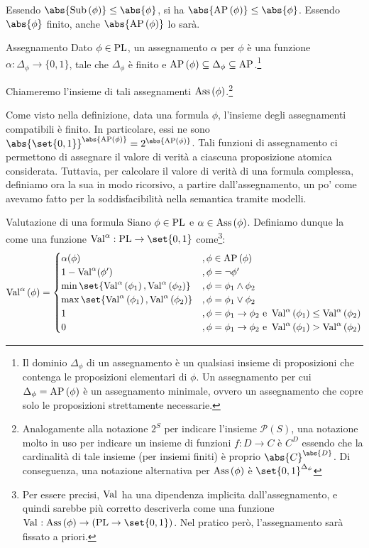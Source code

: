 Essendo \(\abs{\Sub{\phi}}\leq \abs{\phi}\), si ha \(\abs{\AP[\phi]}\leq \abs{\phi}\). Essendo \(\abs{\phi}\) finito, anche \(\abs{\AP[\phi]}\) lo sarà.

\begin{definition}{Assegnamento}
  Dato \(\phi \in \operatorname{PL}\), un assegnamento \(\alpha\) per \(\phi\) è una funzione \(\alpha: \Delta_\phi \rightarrow \{0,1\}\), tale che \(\Delta_\phi\) è finito e \(\AP[\phi] \subseteq \Delta_\phi \subseteq \AP\).\footnote{Il dominio \(\Delta_{\phi}\) di un assegnamento è un qualsiasi insieme di proposizioni che contenga le proposizioni elementari di \(\phi\). Un assegnamento per cui \(\Delta_{\phi}=\AP[\phi]\) è un assegnamento minimale, ovvero un assegnamento che copre solo le proposizioni strettamente necessarie.}

  Chiameremo l'insieme di tali assegnamenti \(\operatorname{Ass}\left(\phi\right)\).\footnote{Analogamente alla notazione \(2^S\) per indicare l'insieme \(\mathcal{P}(S)\), una notazione molto in uso per indicare un insieme di funzioni \(f: D \to C\) è \(C^D\) essendo che la cardinalità di tale insieme (per insiemi finiti) è proprio \(\abs{C}^{\abs{D}}\). Di conseguenza, una notazione alternativa per \(\operatorname{Ass}\left(\phi\right)\) è \(\set{0,1}^{\Delta_\phi}\)}
\end{definition}

Come visto nella definizione, data una formula \(\phi\), l'insieme degli assegnamenti compatibili è finito.
In particolare, essi ne sono \(\abs{\set{0,1}}^{\abs{\AP[\phi]}}=2^{\abs{\AP[\phi]}}\).
Tali funzioni di assegnamento ci permettono di assegnare il valore di verità a ciascuna proposizione atomica considerata. 
Tuttavia, per calcolare il valore di verità di una formula complessa, definiamo ora la sua  in modo ricorsivo, a partire dall'assegnamento, un po' come avevamo fatto per la soddisfacibilità nella semantica tramite modelli.

\begin{definition}{Valutazione di una formula}
  Siano \(\phi \in \operatorname{PL}\) e \(\alpha \in \operatorname{Ass}\left(\phi\right)\). Definiamo dunque la  come una funzione \(\Val{\alpha}: \PL \to \set{0,1}\) come\footnote{Per essere precisi, \(\Val{}\) ha una dipendenza implicita dall'assegnamento, e quindi sarebbe più corretto descriverla come una funzione \(\Val{}: \Ass{\phi} \to (\PL \to \set{0,1})\). Nel pratico però, l'assegnamento sarà fissato a priori.}:
  \[\Val{\alpha}[\phi] = \begin{cases}
  \alpha(\phi) &, \phi \in \AP[\phi] \\
  1 - \Val{\alpha}(\phi') &, \phi = \neg \phi' \\
  \min\set{\Val{\alpha}[\phi_1], \Val{\alpha}[\phi_2]} &, \phi = \phi_1 \land \phi_2 \\
  \max\set{\Val{\alpha}[\phi_1], \Val{\alpha}[\phi_2]} &, \phi = \phi_1 \lor \phi_2 \\
  1 &, \phi = \phi_1 \rightarrow \phi_2 \text{ e } \Val{\alpha}[\phi_1] \leq \Val{\alpha}[\phi_2] \\
  0 &, \phi = \phi_1 \rightarrow \phi_2 \text{ e } \Val{\alpha}[\phi_1] > \Val{\alpha}[\phi_2]
  \end{cases}\]
\end{definition}


